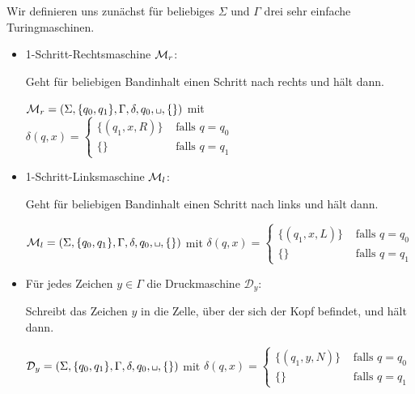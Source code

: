 \begin{Bsp} Wir definieren uns zunächst für beliebiges $\Sigma$ und $\Gamma$ drei sehr einfache Turingmaschinen. 
 \begin{itemize}
  \item 1-Schritt-Rechtsmaschine $\mathcal{M}_r$:
  
  Geht für beliebigen Bandinhalt einen Schritt nach rechts und hält dann.
  
  $\M_r=\left(\Sigma,\{q_0,q_1\},\Gamma,\delta,q_0,\blank,\{\}\right)$ mit
  $\delta(q,x)=\begin{cases}\{(q_1, x, R)\} & \text{ falls } q = q_0\\ \{\} & \text{ falls } q = q_1\end{cases}$
  
  \item 1-Schritt-Linksmaschine $\mathcal{M}_l$:
  
  Geht für beliebigen Bandinhalt einen Schritt nach links und hält dann.

  $\M_l=\left(\Sigma,\{q_0,q_1\},\Gamma,\delta,q_0,\blank,\{\}\right)$ mit
  $\delta(q,x)=\begin{cases}\{(q_1, x, L)\} & \text{ falls } q = q_0\\ \{\} & \text{ falls } q = q_1\end{cases}$
  
  \item Für jedes Zeichen $y\in\Gamma$ die Druckmaschine $\mathcal{D}_y$:
  
  Schreibt das Zeichen $y$ in die Zelle, über der sich der Kopf befindet, und hält dann.

  $\mathcal{D}_y=\left(\Sigma,\{q_0,q_1\},\Gamma,\delta,q_0,\blank,\{\}\right)$ mit
  $\delta(q,x)=\begin{cases}\{(q_1, y, N)\} & \text{ falls } q = q_0\\ \{\} & \text{ falls } q = q_1\end{cases}$

 \end{itemize}
\end{Bsp}

